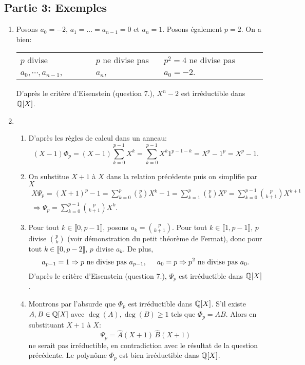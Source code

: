 \subsection*{Partie 3: Exemples}
\begin{enumerate}
   \item Posons $a_{0} = -2$, $a_{1} = ... = a_{n-1} = 0$ et $a_{n} = 1$. Posons également $p=2$. On a bien:
\begin{center}
\begin{tabular}{lll}
$p$ divise $a_{0},\cdots,a_{n-1}$, & $p$ ne divise pas $a_{n}$, & $p^{2} = 4$ ne divise pas $a_{0} = -2$.
\end{tabular}
\end{center}
   D'après le critère d'Eisenstein (question 7.), $X^{n}-2$ est irréductible dans $\mathbb{Q}[X]$. 

  \item 
  \begin{enumerate}
    \item D'après les règles de calcul dans un anneau:
                        $$(X-1)\Phi_{p} = (X-1)\sum_{k=0}^{p-1}X^{k} = \sum_{k=0}^{p-1}X^{k}1^{p-1-k} = X^{p}-1^{p} = X^{p}-1.$$
    \item On substitue $X+1$ à $X$ dans la relation précédente puis on simplifie par $X$
\begin{multline*}
 X\Psi_{p} = (X+1)^{p}-1 = \sum_{k=0}^{p}\binom{p}{k}X^{k}-1 = \sum_{k=1}^{p}\binom{p}{k}X^{p} = \sum_{k=0}^{p-1}\binom{p}{k+1}X^{k+1}\\
 \Rightarrow 
 \Psi_{p} = \sum_{k=0}^{p-1}\binom{p}{k+1}X^{k}.
\end{multline*}
   \item Pour tout $k\in \llbracket 0,p-1\rrbracket$, posons $a_{k} = \displaystyle{\binom{p}{k+1}}$.\newline 
          Pour tout $k\in \llbracket 1, p-1\rrbracket$, $p$ divise $\binom{p}{k}$ (voir démonstration du petit théorème de Fermat), donc pour tout $k\in \llbracket 0, p-2\rrbracket$, $p$ divise $a_{k}$. De plus,
\[
 a_{p-1} = 1 \Rightarrow p \text{ ne divise pas } a_{p-1}, \hspace{0.5cm} a_{0} = p \Rightarrow  p^{2} \text{ ne divise pas } a_{0}.
\]
D'après le critère d'Eisenstein (question 7.), $\Psi_{p}$ est irréductible dans $\mathbb{Q}[X]$. 

  \item Montrons par l'absurde que $\Phi_{p}$ est irréductible dans $\mathbb{Q}[X]$.\newline
  S'il existe $A,B\in \mathbb{Q}[X]$ avec $\deg(A),\deg(B)\geq 1$ tels que $\Phi_{p} = AB$. Alors en substituant $X+1$ à $X$:
\[
\Psi_{p} = \widehat{A}(X+1)\, \widehat{B}(X+1)
\]
ne serait pas irréductible, en contradiction avec le résultat de la question précédente. Le polynôme $\Phi_{p}$ est bien irréductible dans $\mathbb{Q}[X]$. 
  \end{enumerate}
\end{enumerate}




